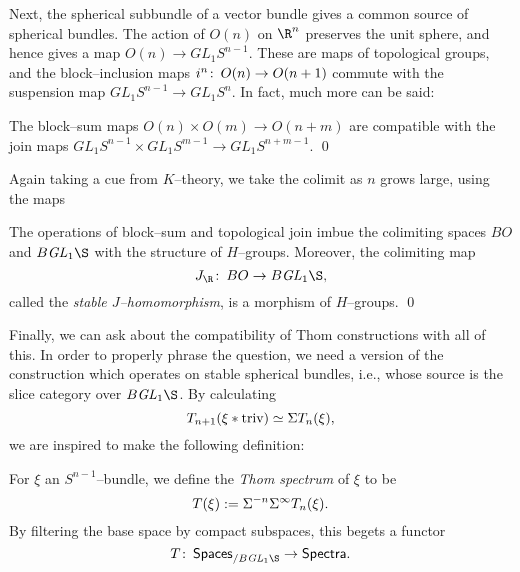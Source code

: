 Next, the spherical subbundle of a vector bundle gives a common source of spherical bundles.  The action of $O(n)$ on $\R^n$ preserves the unit sphere, and hence gives a map $O(n) \to GL_1 S^{n-1}$.  These are maps of topological groups, and the block--inclusion maps $i^n\colon\thinspace O(n) \to O(n+1)$ commute with the suspension map $GL_1 S^{n-1} \to GL_1 S^n$.  In fact, much more can be said:
\begin{lemma}\label{JIsMonoidal}
The block--sum maps $O(n) \times O(m) \to O(n+m)$ are compatible with the join maps $GL_1 S^{n-1} \times GL_1 S^{m-1} \to GL_1 S^{n+m-1}$. \qed
\end{lemma}
\noindent Again taking a cue from $K$--theory, we take the colimit as $n$ grows large, using the maps
\begin{center}
\end{center}
\begin{corollary}\label{DefnRealJHomomorphism}
The operations of block--sum and topological join imbue the colimiting spaces $BO$ and $B\GL_1 \S$ with the structure of $H$--groups.  Moreover, the colimiting map \[J_{\R}\co BO \to B\GL_1 \S,\] called the \textit{stable $J$--homomorphism}, is a morphism of $H$--groups. \qed
\end{corollary}
\noindent Finally, we can ask about the compatibility of Thom constructions with all of this.  In order to properly phrase the question, we need a version of the construction which operates on stable spherical bundles, i.e., whose source is the slice category over $B\GL_1 \S$.  By calculating \[T_{n+1}(\xi \ast \text{triv}) \simeq \Sigma T_n(\xi),\] we are inspired to make the following definition:

\begin{definition}
For $\xi$ an $S^{n-1}$--bundle, we define the \textit{Thom spectrum} of $\xi$ to be \[T(\xi) := \Sigma^{-n} \Sigma^\infty T_n(\xi).\]  By filtering the base space by compact subspaces, this begets a functor \[T\co \CatOf{Spaces}_{/ B\GL_1 \S} \to \CatOf{Spectra}.\]
\end{definition}

